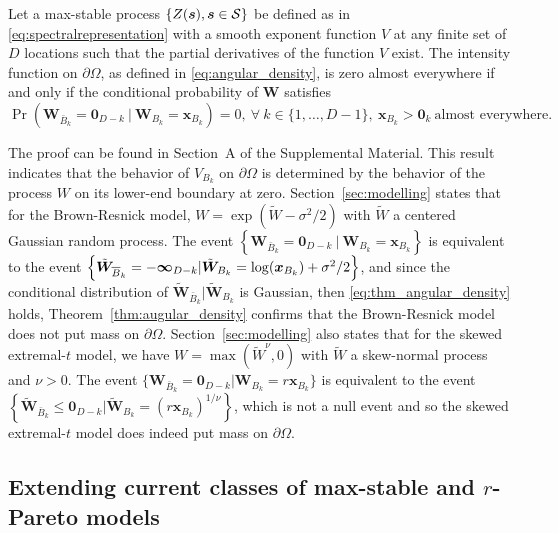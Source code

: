 \documentclass[12pt]{article}
\begin{document}
\begin{theorem}
\label{thm:augular_density}
Let a max-stable process $\{Z({\boldsymbol{s}}), {\boldsymbol{s}}\in {\mathcal{S}}\}$ be defined as in \eqref{eq:spectralrepresentation} with a smooth exponent function $V$ at any finite set of $D$ locations such that the partial derivatives of the function $V$ exist. 
The intensity function on $\partial\Omega$, as defined in \eqref{eq:angular_density}, is zero almost everywhere if and only if the conditional probability of $\bm W$ satisfies
%
\begin{equation}
\label{eq:thm_angular_density}
\Pr(\bm W_{\bar{B}_k}=\bm 0_{D-k} \ |\ \bm W_{B_k} = \bm x_{B_k} )=0,\ \forall\ k \in \{1,\ldots,D-1\},\ \bm x_{B_k}>\bm 0_k \ \text{almost everywhere. }
\end{equation}
%
\end{theorem}
%	
The proof 
can be found in Section~A of the Supplemental Material. This result indicates that the behavior of $V_{B_k}$ on $\partial\Omega$ is determined by the behavior of the process $W$ on its lower-end boundary at zero. Section~\ref{sec:modelling} states that for the Brown-Resnick model, 
$W=\exp \left(\tilde{W} - \sigma^2/2\right)$ with $\tilde W$ a centered Gaussian random process. The event $\left\{ \bm W_{\bar{B}_k}=\bm 0_{D-k} \ |\ \bm W_{B_k} = \bm x_{B_k} \right\}$ is  equivalent to the event $\left\{ \tilde{\bm W}_{{\overline{B}}_k} = -\bm\infty_{D-k} | \tilde{\bm W}_{B_k} = \log({\boldsymbol{x}}_{B_k}) + \sigma^2/2 \right\}$, and since the conditional distribution of $ \tilde{\bm W}_{\bar{B}_k} | \tilde{\bm W}_{B_k}$ is Gaussian, then \eqref{eq:thm_angular_density} holds, Theorem~\ref{thm:augular_density} confirms 
that the Brown-Resnick model does not put mass on $\partial\Omega$. Section~\ref{sec:modelling} also states that for the skewed extremal-$t$ model, we have $W=\max(\tilde W^\nu,0)$ with $\tilde W$ a skew-normal process and $\nu>0$. The event $\{\bm W_{\bar{B}_k} = \bm 0_{D-k} | \bm W_{B_k} = r \bm x_{B_k} \}$ is equivalent to the event $\left\{\tilde{\bm W}_{\bar{B}_k} \leq \bm 0_{D-k} | \tilde{\bm W}_{B_k} = (r \bm x_{B_k})^{1/\nu} \right\}$, which is not a null event and so the skewed extremal-$t$ model does indeed put mass on $\partial\Omega$.

\subsection{Extending current classes of max-stable and $r$-Pareto models}
\label{ssec:new_models}
\end{document}
